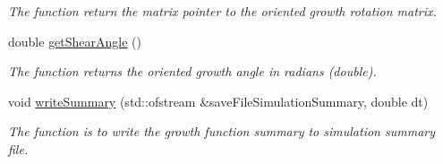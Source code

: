 \begin{DoxyCompactItemize}
\begin{DoxyCompactList}\small\item\em The function return the matrix pointer to the oriented growth rotation matrix. \end{DoxyCompactList}\item 
\hypertarget{classUniformGrowthFunction_a8a60d83743c441f7453af8053d5e7010}{}double \hyperlink{classUniformGrowthFunction_a8a60d83743c441f7453af8053d5e7010}{get\+Shear\+Angle} ()\label{classUniformGrowthFunction_a8a60d83743c441f7453af8053d5e7010}

\begin{DoxyCompactList}\small\item\em The function returns the oriented growth angle in radians (double). \end{DoxyCompactList}\item 
void \hyperlink{classUniformGrowthFunction_a57d05e0d05812b77eac2fd6ca099bd26}{write\+Summary} (std\+::ofstream \&save\+File\+Simulation\+Summary, double dt)
\begin{DoxyCompactList}\small\item\em The function is to write the growth function summary to simulation summary file. \end{DoxyCompactList}\end{DoxyCompactItemize}
